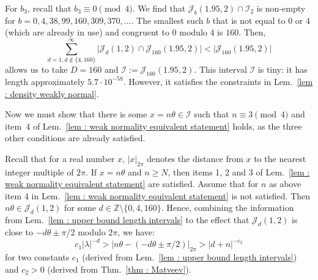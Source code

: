 \documentclass[a4paper,UKenglish,cleveref, autoref, thm-restate]{lipics-v2021}
\begin{document}
For $b_3$, recall that $b_3 \equiv 0 \pmod{4}$.
We find that $\mathcal{J}_b(1.95, 2) \cap \mathcal{I}_2$ is non-empty for $b = 0,4,38, 99, 160, 309, 370,\dots$. 
The smallest such $b$ that is not equal to $0$ or $4$ (which are
already in use) and congruent to $0$ modulo $4$ is $160$.
Then,
\begin{equation*}
    \sum_{d=1, d\notin \{4, 160\}}^\infty \big|\mathcal{J}_d(1, 2) \cap
    \mathcal{J}_{160}(1.95, 2)\big| < \big|\mathcal{J}_{160}(1.95, 2)\big| 
\end{equation*}
allows us to take $D  =160$ and $\mathcal{I} := \mathcal{J}_{160}(1.95, 2)$.
This interval $\mathcal{I}$ is tiny: it has length approximately $5.7 \cdot 10^{-58}$.
However, it satisfies the constraints in Lem.~\ref{lem : density weakly normal}.

Now we must show that there is some $x = n\theta \in \mathcal{I}$ such
that $n \equiv 3 \pmod 4$ and item~4 of Lem.~\ref{lem : weak
  normality equivalent statement} holds, as the three other conditions
are already satisfied.

Recall that for a real number $x$, $|x|_{2\pi}$ denotes the distance from $x$ to the nearest integer multiple of $2\pi$.
If $x = n\theta$ and $n\ge N$, then items 1, 2 and 3 of Lem.~\ref{lem : weak normality equivalent statement} are satisfied. 
Assume that for $n$ as above item 4 in Lem.~\ref{lem : weak normality equivalent statement} is not satisfied. 
Then $n\theta \in \mathcal{J}_d(1, 2)$ for some $d \in \mathbb{Z}\setminus\{0, 4, 160\}$. 
Hence, combining the information from Lem.~\ref{lem : upper bound length intervals} to the effect that $\mathcal{J}_d(1, 2)$ is close to $-d\theta \pm \pi/2$ modulo $2\pi$, we have:
\begin{equation}\label{eq : example Baker end}
    c_1 |\lambda|^{-d} > |n\theta  - (-d\theta \pm \pi/2)|_{2\pi} > |d + n|^{-c_2}
\end{equation}
for two constants $c_1$ (derived from Lem.~\ref{lem : upper bound length intervals}) and $c_2 > 0$ (derived from Thm.~\ref{thm : Matveev}).
\end{document}
